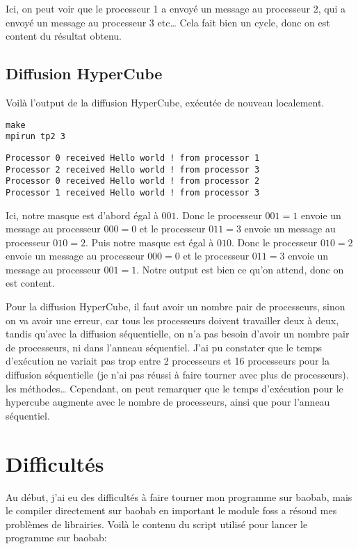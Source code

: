 \documentclass[11pt]{article}
\begin{document}
Ici, on peut voir que le processeur 1 a envoyé un message au processeur 2, qui a envoyé un message au processeur 3 etc\ldots{} Cela fait bien un cycle, donc on est content du résultat obtenu.

\subsection{Diffusion HyperCube}
\label{sec:orgd47d1fc}

Voilà l'output de la diffusion HyperCube, exécutée de nouveau localement.
\begin{verbatim}
make
mpirun tp2 3
\end{verbatim}

\begin{verbatim}
Processor 0 received Hello world ! from processor 1
Processor 2 received Hello world ! from processor 3
Processor 0 received Hello world ! from processor 2
Processor 1 received Hello world ! from processor 3
\end{verbatim}



Ici, notre masque est d'abord égal à \(001\). Donc le processeur \(001 = 1\) envoie un message au processeur \(000 = 0\) et le processeur \(011 = 3\) envoie un message au processeur \(010 = 2\).
Puis notre masque est égal à \(010\). Donc le processeur \(010 = 2\) envoie un message au processeur \(000 = 0\) et le processeur \(011 = 3\) envoie un message au processeur \(001 = 1\).
Notre output est bien ce qu'on attend, donc on est content.

Pour la diffusion HyperCube, il faut avoir un nombre pair de processeurs, sinon on va avoir une erreur, car tous les processeurs doivent travailler deux à deux, tandis qu'avec la diffusion séquentielle, on n'a pas besoin d'avoir un nombre pair de processeurs, ni dans l'anneau séquentiel.
J'ai pu constater que le temps d'exécution ne variait pas trop entre 2 processeurs et 16 processeurs pour la diffusion séquentielle (je n'ai pas réussi à faire tourner avec plus de processeurs).
les méthodes\ldots{} Cependant, on peut remarquer que le temps d'exécution pour le hypercube augmente avec le nombre de processeurs, ainsi que pour l'anneau séquentiel.

\section{Difficultés}
\label{sec:org2735bf0}

Au début, j'ai eu des difficultés à faire tourner mon programme sur baobab, mais le compiler directement sur baobab en important le module foss a résoud mes problèmes de librairies.
Voilà le contenu du script utilisé pour lancer le programme sur baobab:
\end{document}
